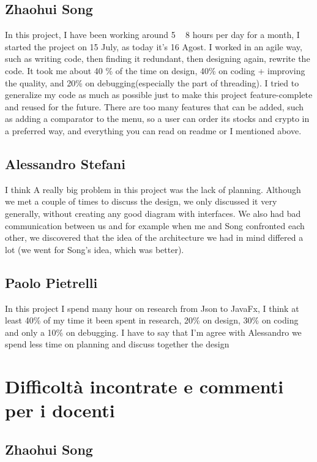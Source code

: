 \documentclass[a4paper,12pt]{report}
\begin{document}
\subsection*{Zhaohui Song}
In this project, I have been working around 5 ~ 8 hours per day for a month, I started the project on 15 July,  as today it's 16 Agost.
%
I worked in an agile way, such as writing code, then finding it redundant, then designing again, rewrite the code. 
%
It took me about 40 \% of the time on design, 40\% on coding + improving the quality, and 20\% on debugging(especially the part of threading). 
%
I tried to generalize my code as much as possible just to make this project feature-complete and reused for the future. 
%
There are too many features that can be added, such as adding a comparator to the menu, so a user can order its stocks and crypto in a preferred way, and everything you can read on readme or I mentioned above.  

\subsection*{Alessandro Stefani}
I think A really big problem in this project was the lack of planning. Although we met a couple of times to discuss the design, we only discussed it very generally, without creating any good diagram with interfaces. We also had bad communication between us and for example when me and Song confronted each other, we discovered that the idea of the architecture we had in mind differed a lot (we went for Song's idea, which was better).

\subsection*{Paolo Pietrelli}
In this project I spend many hour on research from Json to JavaFx, I think at least 40\% of my time it been spent in research, 20\% on design, 30\% on coding and only a 10\% on debugging.
I have to say that I'm agree with Alessandro we spend less time on planning and discuss together the design 

\section{Difficoltà incontrate e commenti per i docenti}
\subsection*{Zhaohui Song}
\end{document}
